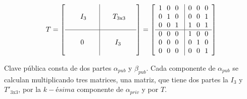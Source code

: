 \begin{equation}\label{eq:ej-T}
{T} =
	\left[\begin{array}{c|c}
	\\
	\ \ \ \ \ I_3\ \ \ \ & \ \ \ \ T_{3\mathrm{x}3} \ \ \  \\
	\\
	\hline
	\\
	0 & I_3\\
	\\
	\end{array}\right] =
	\left[\begin{array}{c|c}
		1\ \ 0\ \ 0\ & 0\ \ 0\ \ 0\\
		0\ \ 1\ \ 0\ & 0\ \ 0\ \ 1\\
		0\ \ 0\ \ 1\ & 1\ \ 0\ \ 1\\
		\hline
		0\ \ 0\ \ 0\ & 1\ \ 0\ \ 0\\
		0\ \ 0\ \ 0\ & 0\ \ 1\ \ 0\\
		0\ \ 0\ \ 0\ & 0\ \ 0\ \ 1
	\end{array}\right]	
\end{equation}


Clave pública consta de dos partes $\alpha_{pub}$ y $\beta_{pub}$. Cada  componente de $\alpha_{pub}$ se calculan multiplicando tres matrices, una matriz, que tiene dos partes la $I_3$ y $T'_{3\mathrm{x}3}$, por la $k-ésima$ componente de $\alpha_{priv}$ y por $T$.

